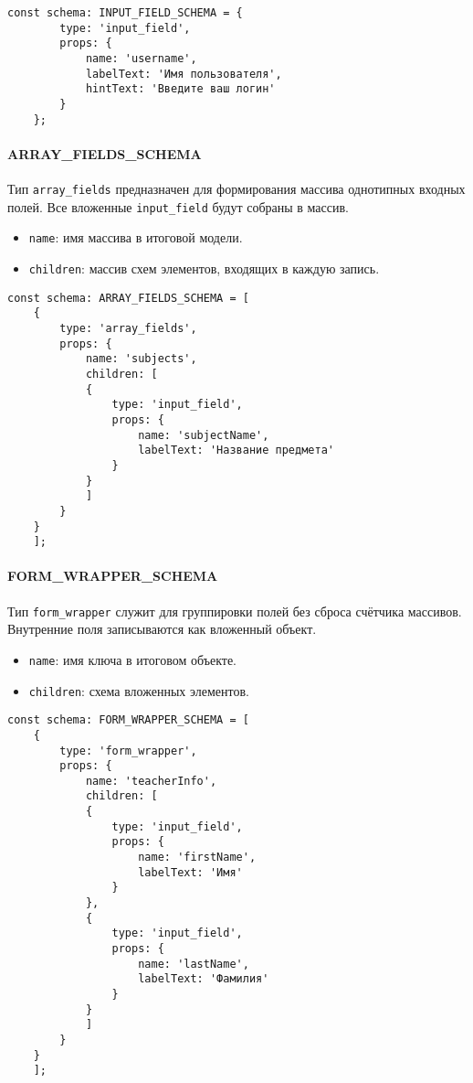 \begin{lstlisting}[caption={Пример INPUT\_FIELD\_SCHEMA}]
	const schema: INPUT_FIELD_SCHEMA = {
		type: 'input_field',
		props: {
			name: 'username',
			labelText: 'Имя пользователя',
			hintText: 'Введите ваш логин'
		}
	};
\end{lstlisting}

\paragraph{ARRAY\_FIELDS\_SCHEMA}
Тип \texttt{array\_fields} предназначен для формирования массива однотипных входных полей. Все вложенные \texttt{input\_field} будут собраны в массив.
\begin{itemize}
	\item \texttt{name}: имя массива в итоговой модели.
	\item \texttt{children}: массив схем элементов, входящих в каждую запись.
\end{itemize}

\begin{lstlisting}[caption={Пример ARRAY\_FIELDS\_SCHEMA}]
	const schema: ARRAY_FIELDS_SCHEMA = [
	{
		type: 'array_fields',
		props: {
			name: 'subjects',
			children: [
			{
				type: 'input_field',
				props: {
					name: 'subjectName',
					labelText: 'Название предмета'
				}
			}
			]
		}
	}
	];
\end{lstlisting}

\paragraph{FORM\_WRAPPER\_SCHEMA}
Тип \texttt{form\_wrapper} служит для группировки полей без сброса счётчика массивов. Внутренние поля записываются как вложенный объект.
\begin{itemize}
	\item \texttt{name}: имя ключа в итоговом объекте.
	\item \texttt{children}: схема вложенных элементов.
\end{itemize}

\begin{lstlisting}[caption={Пример FORM\_WRAPPER\_SCHEMA}]
	const schema: FORM_WRAPPER_SCHEMA = [
	{
		type: 'form_wrapper',
		props: {
			name: 'teacherInfo',
			children: [
			{
				type: 'input_field',
				props: {
					name: 'firstName',
					labelText: 'Имя'
				}
			},
			{
				type: 'input_field',
				props: {
					name: 'lastName',
					labelText: 'Фамилия'
				}
			}
			]
		}
	}
	];
\end{lstlisting}

